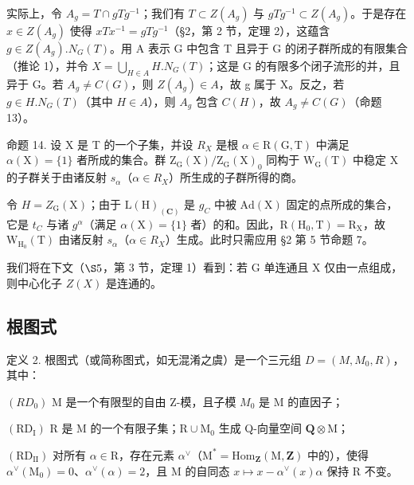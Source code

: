 实际上，令 \(A_{g} = T \cap gTg^{-1}\)；我们有 \(T \subset Z(A_{g})\) 与 \(gTg^{-1} \subset Z(A_{g})\)。于是存在 \(x \in Z(A_{g})\) 使得 \(xTx^{-1} = gTg^{-1}\)（§2，第 2 节，定理 2），这蕴含 \(g \in Z(A_{g}).N_{G}(T)\)。用 A 表示 G 中包含 T 且异于 G 的闭子群所成的有限集合（推论 1），并令 \(X = \bigcup_{H \in A} H.N_{G}(T)\)；这是 G 的有限多个闭子流形的并，且异于 G。若 \(A_{g} \neq C(G)\)，则 \(Z(A_{g}) \in A\)，故 g 属于 X。反之，若 \(g \in H.N_{G}(T)\)（其中 \(H \in A\)），则 \(A_{g}\) 包含 \(C(H)\)，故 \(A_{g} \neq C(G)\)（命题 13）。

命题 14. 设 X 是 T 的一个子集，并设 \(R_{X}\) 是根 \(\alpha \in \mathrm{R}(\mathrm{G}, \mathrm{T})\) 中满足 \(\alpha(\mathrm{X}) = \{1\}\) 者所成的集合。群 \(\mathrm{Z}_{\mathrm{G}}(\mathrm{X}) / \mathrm{Z}_{\mathrm{G}}(\mathrm{X})_{0}\) 同构于 \(\mathrm{W}_{\mathrm{G}}(\mathrm{T})\) 中稳定 X 的子群关于由诸反射 \(s_{\alpha}\)（\(\alpha \in R_{X}\)）所生成的子群所得的商。

令 \(H = Z_{\mathrm{G}}(\mathrm{X})\)；由于 \(\mathrm{L}(\mathrm{H})_{(\mathbf{C})}\) 是 \(g_{C}\) 中被 \(\mathrm{Ad}(\mathrm{X})\) 固定的点所成的集合，它是 \(t_{C}\) 与诸 \(g^{\alpha}\)（满足 \(\alpha(\mathrm{X}) = \{1\}\) 者）的和。因此，\(\mathrm{R}(\mathrm{H}_{0}, \mathrm{T}) = \mathrm{R}_{\mathrm{X}}\)，故 \(\mathrm{W}_{\mathrm{H}_{0}}(\mathrm{T})\) 由诸反射 \(s_{\alpha}\)（\(\alpha \in R_{X}\)）生成。此时只需应用 §2 第 5 节命题 7。

我们将在下文（\(\S5\)，第 3 节，定理 1）看到：若 G 单连通且 X 仅由一点组成，则中心化子 \(Z(X)\) 是连通的。

\subsection{根图式}

定义 2. 根图式（或简称图式，如无混淆之虞）是一个三元组 \(D = (M, M_{0}, R)\)，其中：

\((RD_{0})\) M 是一个有限型的自由 Z-模，且子模 \(M_{0}\) 是 M 的直因子；

\((\mathrm{RD}_{\mathrm{I}})\) R 是 M 的一个有限子集；\(\mathrm{R} \cup \mathrm{M}_0\) 生成 Q-向量空间 \(\mathbf{Q} \otimes \mathrm{M}\)；

\((\mathrm{RD}_{\mathrm{II}})\) 对所有 \(\alpha \in \mathrm{R}\)，存在元素 \(\alpha^{\vee}\)（\(\mathrm{M}^{*} = \mathrm{Hom}_{\mathbf{Z}}(\mathrm{M}, \mathbf{Z})\) 中的），使得 \(\alpha^{\vee}(\mathrm{M}_{0}) = 0\)、\(\alpha^{\vee}(\alpha) = 2\)，且 M 的自同态 \(x \mapsto x - \alpha^{\vee}(x)\alpha\) 保持 R 不变。

